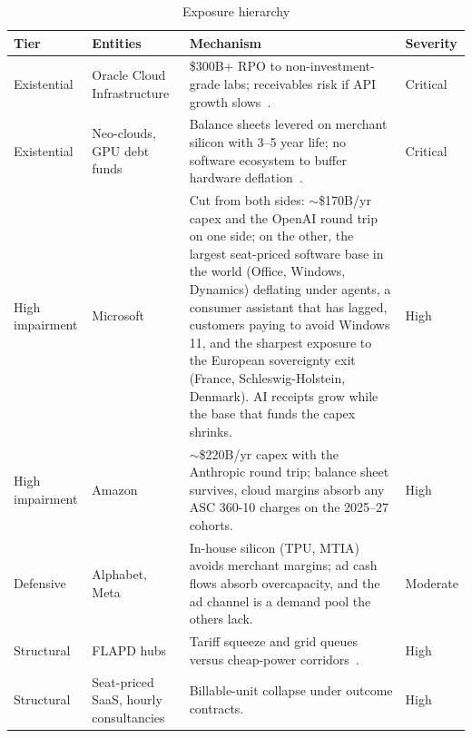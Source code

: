 \documentclass[11pt,letterpaper]{article}
\begin{document}
\begin{table}[htbp]
\centering
\small
\caption{Exposure hierarchy}
\label{tab:losers}
\begin{tabularx}{\textwidth}{L{2.6cm}L{3.0cm}Xl}
\toprule
\textbf{Tier} & \textbf{Entities} & \textbf{Mechanism} & \textbf{Severity} \\
\midrule
Existential & Oracle Cloud Infrastructure & \$300B+ RPO to non-investment-grade labs; receivables risk if API growth slows~\cite{ref:oracle_10q}. & Critical \\
Existential & Neo-clouds, GPU debt funds & Balance sheets levered on merchant silicon with 3--5 year life; no software ecosystem to buffer hardware deflation~\cite{ref:coreweave_s1}. & Critical \\
High impairment & Microsoft & Cut from both sides: $\sim$\$170B/yr capex and the OpenAI round trip on one side; on the other, the largest seat-priced software base in the world (Office, Windows, Dynamics) deflating under agents, a consumer assistant that has lagged, customers paying to avoid Windows 11, and the sharpest exposure to the European sovereignty exit (France, Schleswig-Holstein, Denmark). AI receipts grow while the base that funds the capex shrinks. & High \\
High impairment & Amazon & $\sim$\$220B/yr capex with the Anthropic round trip; balance sheet survives, cloud margins absorb any ASC 360-10 charges on the 2025--27 cohorts. & High \\
Defensive & Alphabet, Meta & In-house silicon (TPU, MTIA) avoids merchant margins; ad cash flows absorb overcapacity, and the ad channel is a demand pool the others lack. & Moderate \\
Structural & FLAPD hubs & Tariff squeeze and grid queues versus cheap-power corridors~\cite{ref:eirgrid_cru,ref:amsterdam}. & High \\
Structural & Seat-priced SaaS, hourly consultancies & Billable-unit collapse under outcome contracts. & High \\
\bottomrule
\end{tabularx}
\end{table}
\end{document}

